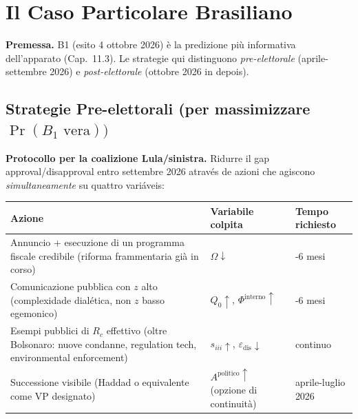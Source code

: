 \section{Il Caso Particolare
Brasiliano}\label{il-caso-particolare-brasileiro}

\Hypoth{} \textbf{Premessa.} B1 (esito 4 ottobre 2026) è la predizione
più informativa dell'apparato (Cap.~11.3). Le strategie qui distinguono
\emph{pre-elettorale} (aprile-settembre 2026) e \emph{post-elettorale}
(ottobre 2026 in depois).

\subsection{\texorpdfstring{Strategie Pre-elettorali (per massimizzare
\(\Pr(B_1 \text{ vera}))\)}{Strategie Pre-elettorali (per massimizzare \textbackslash Pr(B\_1 \textbackslash text\{ vera\}))}}\label{strategie-pre-elettorali-per-massimizzare-prb_1-text-vera}

\Hypoth{} \textbf{Protocollo per la coalizione Lula/sinistra.} Ridurre
il gap approval/disapproval entro settembre 2026 através de azioni che
agiscono \emph{simultaneamente} su quattro variáveis:

{\def\LTcaptype{none} %
{\small\begin{longtable}[]{@{}
  >{\raggedright\arraybackslash}p{}
  >{\raggedright\arraybackslash}p{}
  >{\raggedright\arraybackslash}p{}@{}}
\toprule\noalign{}
\begin{minipage}[b]{\linewidth}\raggedright
Azione
\end{minipage} & \begin{minipage}[b]{\linewidth}\raggedright
Variabile colpita
\end{minipage} & \begin{minipage}[b]{\linewidth}\raggedright
Tempo richiesto
\end{minipage} \\
\midrule\noalign{}
\endhead
\bottomrule\noalign{}
\endlastfoot
Annuncio + esecuzione di un programma fiscale credibile (riforma
frammentaria già in corso) & \(\Omega \downarrow\) & 4-6 mesi \\
Comunicazione pubblica con \(z\) alto (complexidade dialética, non \(z\)
basso egemonico) & \(Q_0 \uparrow\), \(\Phi^{\text{interno}} \uparrow\)
& 3-6 mesi \\
Esempi pubblici di \(R_c\) effettivo (oltre Bolsonaro: nuove condanne,
regulation tech, environmental enforcement) & \(s_{iii} \uparrow\),
\(\varepsilon_{\text{dis}} \downarrow\) & continuo \\
Successione visibile (Haddad o equivalente come VP designato) &
\(A^{\text{politico}} \uparrow\) (opzione di continuità) & aprile-luglio
2026 \\
\end{longtable}}
}

